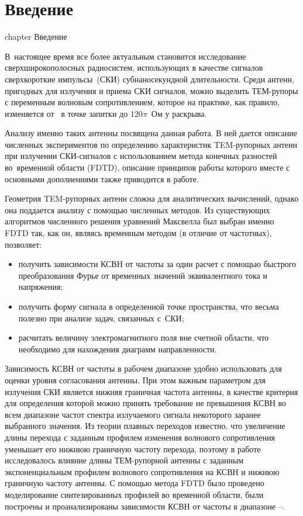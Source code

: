 %
%
%
\chapter* {Введение}
 {chapter} {Введение}

В~настоящее время все более актуальным становится исследование
сверхширокополосных радиосистем, использующих в качестве сигналов сверхкороткие
импульсы~(СКИ) субнаносекундной длительности. Среди антенн, пригодных для излучения
и приема СКИ сигналов, можно выделить ТЕМ-рупоры с переменным волновым
сопротивлением, которое на практике, как правило, изменяется от~
в точке запитки до $120\pi$~Ом у раскрыва.

Анализу именно таких антенны посвящена данная работа. В ней дается описание
численных экспериментов по определению характеристик TEM-рупорных
антенн при излучении СКИ-сигналов с использованием метода конечных разностей
во~временной области (FDTD), описание принципов работы которого вместе
с основными дополнениями также приводится в работе.

Геометрия TEM-рупорных антенн сложна для аналитических вычислений, однако она
поддается анализу с помощью численных методов. Из существующих алгоритмов
численного решения уравнений Максвелла был выбран именно FDTD так, как он,
являясь временным методом (в отличие от частотных), позволяет:
\begin{itemize}
\item получить зависимости КСВН от частоты за один расчет с помощью быстрого
      преобразования Фурье от временных значений эквивалентного тока
      и напряжения;
\item получить форму сигнала в определенной точке пространства, что весьма
      полезно при анализе задач, связанных с~СКИ;
\item расчитать величину электромагнитного поля вне счетной области, что необходимо
      для нахождения диаграмм направленности.
\end{itemize}

Зависимость КСВН от частоты в рабочем диапазоне удобно использовать для оценки
уровня согласования антенны. При этом важным параметром для излучения СКИ
является нижняя граничная частота антенны, в качестве критерия для определения
которой можно принять требование не превышения КСВН во всем диапазоне частот
спектра излучаемого сигнала некоторого заранее выбранного значения.
Из теории плавных переходов известно, что
увеличение длины перехода с заданным профилем изменения волнового сопротивления
уменьшает его нижнюю граничную частоту перехода, поэтому в работе исследовалось
влияние длины ТЕМ-рупорной антенны с заданным экспоненциальным профилем
волнового сопротивления на КСВН и нижнюю граничную частоту антенны. С помощью
метода FDTD было проведено моделирование синтезированных профилей во временной
области, были построены и проанализированы зависимости КСВН от частоты
в диапазоне --.

